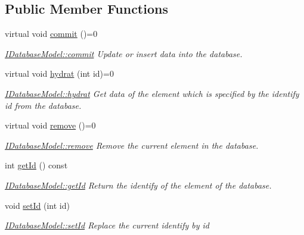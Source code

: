 \subsection*{Public Member Functions}
\begin{DoxyCompactItemize}
\item 
\hypertarget{classIDatabaseModel_a2d4fd70557c1815d100df17ba0751cbd}{virtual void \hyperlink{classIDatabaseModel_a2d4fd70557c1815d100df17ba0751cbd}{commit} ()=0}\label{classIDatabaseModel_a2d4fd70557c1815d100df17ba0751cbd}

\begin{DoxyCompactList}\small\item\em \hyperlink{classIDatabaseModel_a2d4fd70557c1815d100df17ba0751cbd}{I\+Database\+Model\+::commit} Update or insert data into the database. \end{DoxyCompactList}\item 
virtual void \hyperlink{classIDatabaseModel_a25e44ed10a75976f86e14d34aea02c37}{hydrat} (int id)=0
\begin{DoxyCompactList}\small\item\em \hyperlink{classIDatabaseModel_a25e44ed10a75976f86e14d34aea02c37}{I\+Database\+Model\+::hydrat} Get data of the element which is specified by the identify {\itshape id} from the database. \end{DoxyCompactList}\item 
\hypertarget{classIDatabaseModel_a11d94697daf0af2b44fbe37ef831ea94}{virtual void \hyperlink{classIDatabaseModel_a11d94697daf0af2b44fbe37ef831ea94}{remove} ()=0}\label{classIDatabaseModel_a11d94697daf0af2b44fbe37ef831ea94}

\begin{DoxyCompactList}\small\item\em \hyperlink{classIDatabaseModel_a11d94697daf0af2b44fbe37ef831ea94}{I\+Database\+Model\+::remove} Remove the current element in the database. \end{DoxyCompactList}\item 
int \hyperlink{classIDatabaseModel_a61523b015ec148d4e68ee8054c2ad3e3}{get\+Id} () const 
\begin{DoxyCompactList}\small\item\em \hyperlink{classIDatabaseModel_a61523b015ec148d4e68ee8054c2ad3e3}{I\+Database\+Model\+::get\+Id} Return the identify of the element of the database. \end{DoxyCompactList}\item 
void \hyperlink{classIDatabaseModel_ad4f47f3e25302c506ce98103e616ca57}{set\+Id} (int id)
\begin{DoxyCompactList}\small\item\em \hyperlink{classIDatabaseModel_ad4f47f3e25302c506ce98103e616ca57}{I\+Database\+Model\+::set\+Id} Replace the current identify by {\itshape id} \end{DoxyCompactList}\end{DoxyCompactItemize}
